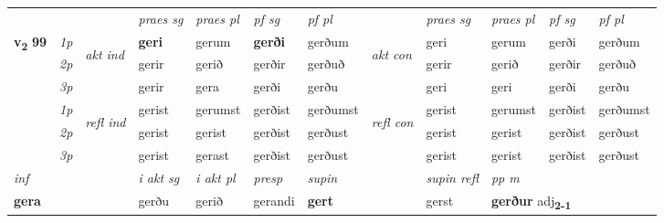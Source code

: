 \begin{longtable}[l]{X>{\footnotesize\itshape}llXXXXlXXXX}
 & &   & \textit{praes sg}  & \textit{praes pl}    & \textit{ pf sg} & \textit{pf pl} & & \textit{praes sg}  & \textit{praes pl}    & \textit{pf sg} & \textit{pf pl }  \\ \cmidrule{4-7} \cmidrule{9-12}
 \multirow{2}{*}{{{\textbf{v{\textsubscript{2}}} \Large{\textbf{99}}}}}  & 1p & \multirow{3}{*}{\begin{turn}{90}\textit{akt ind}\end{turn}} & \textbf{geri} & gerum & \textbf{gerði} & gerðum & \multirow{3}{*}{\begin{turn}{90}\textit{akt con}\end{turn}} &geri & gerum & gerði & gerðum\\*
 & 2p &  &  gerir  & gerið & gerðir & gerðuð & & gerir & gerið & gerðir & gerðuð \\*
 & 3p &  & gerir & gera & gerði & gerðu & & geri & geri& gerði & gerðu \\*
\cmidrule{4-7} \cmidrule{9-12}
 & 1p & \multirow{3}{*}{\begin{turn}{90}\textit{refl ind}\end{turn}}  & gerist & gerumst & gerðist & gerðumst & \multirow{3}{*}{\begin{turn}{90}\textit{refl con}\end{turn}}  &gerist & gerumst & gerðist & gerðumst \\*
 & 2p &  & gerist & gerist & gerðist & gerðust & &gerist & gerist & gerðist & gerðust \\*
 & 3p  & & gerist & gerast & gerðist & gerðust & & gerist & gerist& gerðist & gerðust \\*
\cmidrule{4-7} \cmidrule{9-12}

 {\textit{inf}} & &  & \textit{i akt sg} & \textit{i akt pl}   & \textit{presp} & \textit{supin} && \textit{supin refl} & \textit{pp m} \\*
 {\textbf{gera}} & && gerðu  & gerið   & gerandi &  \textbf{gert} && gerst & \multicolumn{2}{l}{\textbf{gerður} adj\textbf{\textsubscript{2-1}}} \\*
\midrule


\end{longtable}
